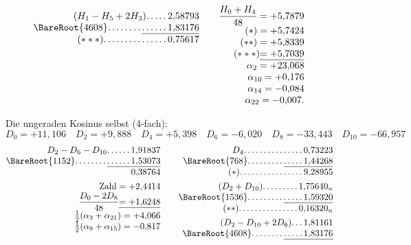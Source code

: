 \begin{landscape}
\[\begin{array}{@{}r@{\qquad}r@{\qquad}r@{}}
\begin{array}[t]{@{}r@{}}
(H_1-H_5+2H_3)\VfourDots{4}2{,}58793\\
\BareRoot{4608}\VfourDots{7}\underline{\VfourDots{5}1{,}83176}\\
(***)\VfourDots{14}0{,}75617
\end{array}
&\begin{array}[t]{@{}r@{}}
\dfrac{H_0+H_4}{48}=+5{,}7879\\
(*)=+5{,}7424\\
(**)=+5{,}8339\\
(***)\underline{=+5{,}7039}\\
\alpha_2=+23{,}068\\
\alpha_{10}=+0{,}176\\
\alpha_{14}=-0{,}084\\
\alpha_{22}=-0{,}007.
\end{array}
\end{array}
\]
\par\noindent\hspace*{\parindent}Die ungeraden Kosinus selbst (4-fach):
\[D_0=+11{,}106\quad D_2=+9{,}888\quad D_4=+5{,}398\quad D_6=-6{,}020\quad D_8=-33{,}443\quad D_{10}=-66{,}957\]
\clearpage{}
\[
\begin{array}{@{}r@{\qquad}r@{\qquad}r@{}}
\begin{array}[t]{@{}r@{}}
D_2-D_6-D_{10}\VfourDots{5}1{,}91837\\
\BareRoot{1152}\VfourDots{7}\underline{\VfourDots{5}1{,}53073}\\
0{,}38764\\[4pt]
\text{Zahl}=+2{,}4414\\
\dfrac{D_0-2D_8}{48}\underline{=+1{,}6248}\\
\tfrac12(\alpha_3+\alpha_{21})=+4{,}066\\
\tfrac12(\alpha_9+\alpha_{15})=-0{,}817
\end{array}
&\begin{array}[t]{@{}r@{}}
D_4\VfourDots{14}0{,}73223\\
\BareRoot{768}\VfourDots{8}\underline{\VfourDots{4}1{,}44268}\\
(*)\VfourDots{15}9{,}28955\\[4pt]
(D_2+D_{10})\VfourDots{8}1{,}75640_n\\
\BareRoot{1536}\VfourDots{8}\underline{\VfourDots{4}1{,}59320}\\
(**)\VfourDots{14}0{,}16320_n\\[4pt]
(D_2-D_{10}+2D_6)\VfourDots{2}1{,}81161\\
\BareRoot{4608}\VfourDots{7}\underline{\VfourDots{4}1{,}83176}\\

\end{array}
\end{array}\]
\end{landscape}
